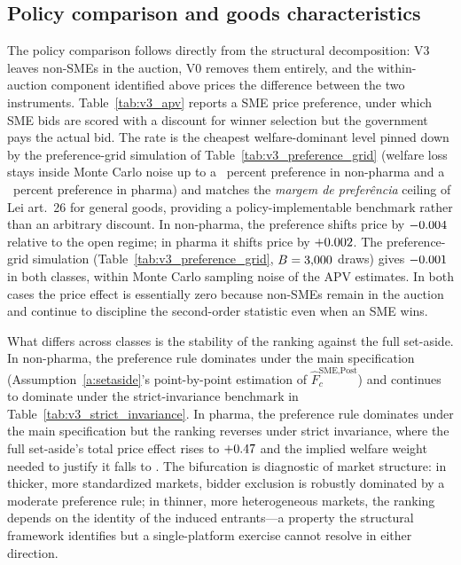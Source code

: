 \subsection{Policy comparison and goods characteristics}\label{sec:pareto}

The policy comparison follows directly from the structural decomposition: V3 leaves non-SMEs in the auction, V0 removes them entirely, and the within-auction component identified above prices the difference between the two instruments. Table~\ref{tab:v3_apv} reports a \optPrefThreshold{} SME price preference, under which SME bids are scored with a \optPrefThreshold{} discount for winner selection but the government pays the actual bid. The \optPrefThreshold{} rate is the cheapest welfare-dominant level pinned down by the preference-grid simulation of Table~\ref{tab:v3_preference_grid} (welfare loss stays inside Monte Carlo noise up to a \prefSafeBandHiNp~percent preference in non-pharma and a \prefSafeBandHiPh~percent preference in pharma) and matches the \emph{margem de preferência} ceiling of Lei \leiNova{} art.~26 for general goods, providing a policy-implementable benchmark rather than an arbitrary discount. In non-pharma, the preference shifts price by $-0.004$ relative to the open regime; in pharma it shifts price by $+0.002$. The preference-grid simulation (Table~\ref{tab:v3_preference_grid}, $B = 3{,}000$ draws) gives $-0.001$ in both classes, within Monte Carlo sampling noise of the APV estimates. In both cases the price effect is essentially zero because non-SMEs remain in the auction and continue to discipline the second-order statistic even when an SME wins.

What differs across classes is the stability of the ranking against the full set-aside. In non-pharma, the preference rule dominates under the main specification (Assumption~\ref{a:setaside}'s point-by-point estimation of $\hat F_c^{\text{SME,Post}}$) and continues to dominate under the strict-invariance benchmark in Table~\ref{tab:v3_strict_invariance}. In pharma, the preference rule dominates under the main specification but the ranking reverses under strict invariance, where the full set-aside's total price effect rises to $+0.47$ and the implied welfare weight needed to justify it falls to \welfWeightSiPh. The bifurcation is diagnostic of market structure: in thicker, more standardized markets, bidder exclusion is robustly dominated by a moderate preference rule; in thinner, more heterogeneous markets, the ranking depends on the identity of the induced entrants---a property the structural framework identifies but a single-platform exercise cannot resolve in either direction.
